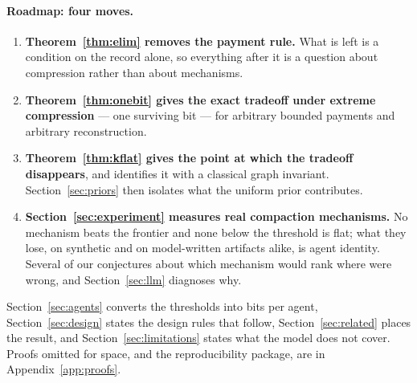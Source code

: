 \paragraph{Roadmap: four moves.}
\begin{enumerate}
\item \textbf{Theorem~\ref{thm:elim} removes the payment rule.} What is left is
      a condition on the record alone, so everything after it is a question about
      compression rather than about mechanisms.
\item \textbf{Theorem~\ref{thm:onebit} gives the exact tradeoff under extreme
      compression} --- one surviving bit --- for arbitrary bounded payments and
      arbitrary reconstruction.
\item \textbf{Theorem~\ref{thm:kflat} gives the point at which the tradeoff
      disappears}, and identifies it with a classical graph invariant.
      Section~\ref{sec:priors} then isolates what the uniform prior contributes.
\item \textbf{Section~\ref{sec:experiment} measures real compaction mechanisms.}
      No mechanism beats the frontier and none below the threshold is flat; what
      they lose, on synthetic and on model-written artifacts alike, is agent
      identity. Several of our conjectures about which mechanism would rank
      where were wrong, and Section~\ref{sec:llm} diagnoses why.
\end{enumerate}
Section~\ref{sec:agents} converts the thresholds into bits per agent,
Section~\ref{sec:design} states the design rules that follow,
Section~\ref{sec:related} places the result, and
Section~\ref{sec:limitations} states what the model does not cover. Proofs
omitted for space, and the reproducibility package, are in
Appendix~\ref{app:proofs}.

